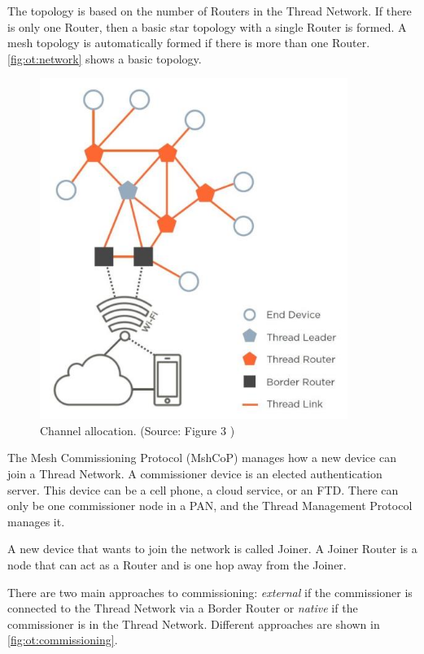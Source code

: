The topology is based on the number of Routers in the Thread Network.
If there is only one Router, then a basic star topology with a single Router is formed.
A mesh topology is automatically formed if there is more than one Router.
\autoref{fig:ot:network} shows a basic topology.

\begin{figure}[!ht]
    \centering
    \includegraphics[width=100mm, keepaspectratio]{figures/thread-topology-ThreadNetworkFundamentals_633_4.jpg}
    \caption{Channel allocation. (Source: Figure 3 \cite{thread:nfwp})}
    \label{fig:ot:network}
\end{figure}

The Mesh Commissioning Protocol (MshCoP) manages how a new device can join a Thread Network.
A commissioner device is an elected authentication server.
This device can be a cell phone, a cloud service, or an FTD.
There can only be one commissioner node in a PAN, and the Thread Management Protocol manages it.

A new device that wants to join the network is called Joiner.
A Joiner Router is a node that can act as a Router and is one hop away from the Joiner.

There are two main approaches to commissioning:
\emph{external} if the commissioner is connected to the Thread Network via a Border Router or
\emph{native} if the commissioner is in the Thread Network. 
Different approaches are shown in \autoref{fig:ot:commissioning}.

